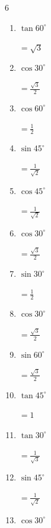 \begin{multicols}{6}
\begin{enumerate}
        $\displaystyle =\frac{1}{\sqrt{3}}$

  \item $\displaystyle \tan{60^\circ}$

        $\displaystyle =\sqrt{3}$

  \item $\displaystyle \cos{30^\circ}$

        $\displaystyle =\frac{\sqrt{3}}{2}$

  \item $\displaystyle \cos{60^\circ}$

        $\displaystyle =\frac{1}{2}$

  \item $\displaystyle \sin{45^\circ}$

        $\displaystyle =\frac{1}{\sqrt{2}}$

\columnbreak %

  \item $\displaystyle \cos{45^\circ}$

        $\displaystyle =\frac{1}{\sqrt{2}}$

  \item $\displaystyle \cos{30^\circ}$

        $\displaystyle =\frac{\sqrt{3}}{2}$

  \item $\displaystyle \sin{30^\circ}$

        $\displaystyle =\frac{1}{2}$

  \item $\displaystyle \cos{30^\circ}$

        $\displaystyle =\frac{\sqrt{3}}{2}$

  \item $\displaystyle \sin{60^\circ}$

        $\displaystyle =\frac{\sqrt{3}}{2}$

  \item $\displaystyle \tan{45^\circ}$

        $\displaystyle =1$

  \item $\displaystyle \tan{30^\circ}$

        $\displaystyle =\frac{1}{\sqrt{3}}$

  \item $\displaystyle \sin{45^\circ}$

        $\displaystyle =\frac{1}{\sqrt{2}}$

  \item $\displaystyle \cos{30^\circ}$


\end{enumerate}
\end{multicols}
